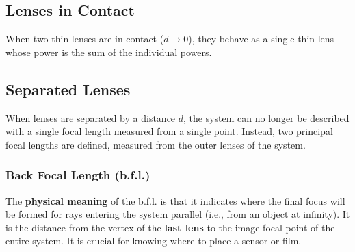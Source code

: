 \subsection*{Lenses in Contact}
When two thin lenses are in contact ($d \to 0$), they behave as a single thin lens whose power is the sum of the individual powers.

\vspace{0.5cm}
\noindent{}
\vspace{0.5cm}

\subsection*{Separated Lenses}
When lenses are separated by a distance $d$, the system can no longer be described with a single focal length measured from a single point. Instead, two principal focal lengths are defined, measured from the outer lenses of the system.

\subsubsection*{Back Focal Length (b.f.l.)}
The \textbf{physical meaning} of the b.f.l. is that it indicates where the final focus will be formed for rays entering the system parallel (i.e., from an object at infinity). It is the distance from the vertex of the \textbf{last lens} to the image focal point of the entire system. It is crucial for knowing where to place a sensor or film.

\vspace{0.5cm}
\noindent{}
\vspace{0.5cm}

